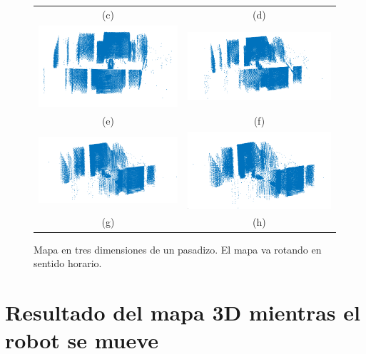 \begin{figure}
\begin{tabular}{cc}
      (c)&(d)\\
      \includegraphics[width=.52\textwidth]{images/pasadizo_4.png}&
      \includegraphics[width=.52\textwidth]{images/pasadizo_3.png}\\
      (e)&(f)\\
      \includegraphics[width=.52\textwidth]{images/pasadizo_2.png}&
      \includegraphics[width=.52\textwidth]{images/pasadizo_1.png}\\
      (g)&(h)
    \end{tabular}
  \captionsetup{font=footnotesize}
    \caption{\label{fig:pasadizo3D}Mapa en tres dimensiones de un pasadizo. El 
    mapa va rotando en sentido horario.}
\end{figure}

\section{Resultado del mapa 3D mientras el robot se mueve}


